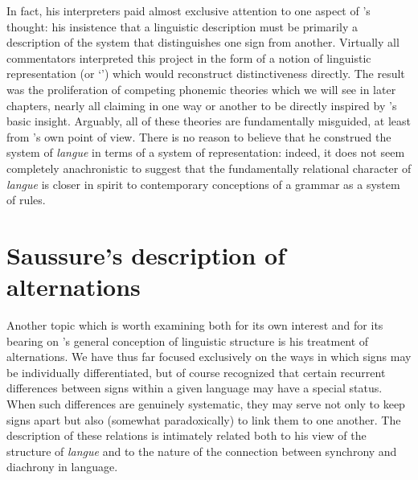 In fact, his interpreters paid almost exclusive attention to one
aspect of {\Saussure}'s thought: his insistence that a linguistic
description must be primarily a description of the system that
distinguishes one sign from another. Virtually all commentators
interpreted this project in the form of a notion of linguistic
representation (or `') which would reconstruct
distinctiveness directly. The result was the proliferation of
competing phonemic theories which we will see in later chapters,
nearly all claiming in one way or another to be directly inspired by
{\Saussure}'s basic insight. Arguably, all of these theories are
fundamentally misguided, at least from {\Saussure}'s own point of
view. There is no reason to believe that he construed the system of
\emph{langue} in terms of a system of representation: indeed, it does
not seem completely anachronistic to suggest that the fundamentally
relational character of \emph{langue} is closer in spirit to 
contemporary conceptions of a grammar as a system of {rules}.

\section{Saussure's description of alternations}

Another topic which is worth examining both for its own interest and
for its bearing on {\Saussure}'s general conception of linguistic
structure is his treatment of alternations. We have thus far focused
exclusively on the ways in which signs may be individually
differentiated, but of course {\Saussure} recognized that certain
recurrent differences between signs within a given language may have a
special status. When such differences are genuinely systematic, they
may serve not only to keep signs apart but also (somewhat
paradoxically) to link them to one another. The description of these
relations is intimately related both to his view of the structure of
\emph{langue} and to the nature of the connection between synchrony
and diachrony in language.

